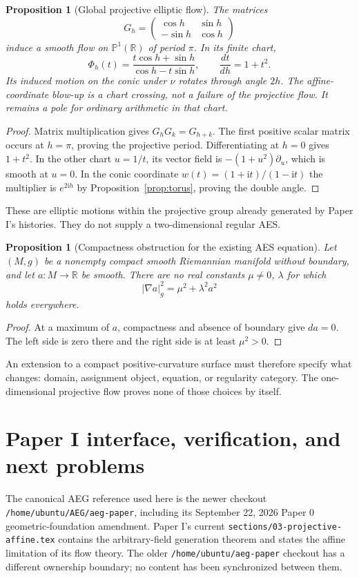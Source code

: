 \documentclass[11pt]{article}
\newtheorem{proposition}[theorem]{Proposition}
\theoremstyle{definition}
\theoremstyle{remark}
\newcommand{\R}{\mathbb R}
\newcommand{\PP}{\mathbb P}
\newcommand{\ii}{\mathrm i}
\begin{document}
\begin{proposition}[Global projective elliptic flow]\label{prop:real-flow}
The matrices
\[
 G_h=\begin{pmatrix}\cos h&\sin h\\-\sin h&\cos h\end{pmatrix}
\]
induce a smooth flow on $\PP^1(\R)$ of period $\pi$. In its finite chart,
\[
 \Phi_h(t)=\frac{t\cos h+\sin h}{\cos h-t\sin h},\qquad
 \frac{dt}{dh}=1+t^2.
\]
Its induced motion on the conic under $\nu$ rotates through angle $2h$.
The affine-coordinate blow-up is a chart crossing, not a failure of the
projective flow. It remains a pole for ordinary arithmetic in that chart.
\end{proposition}
\begin{proof}
Matrix multiplication gives $G_hG_k=G_{h+k}$. The first positive scalar
matrix occurs at $h=\pi$, proving the projective period. Differentiating at
$h=0$ gives $1+t^2$. In the other chart $u=1/t$, its vector field is
$-(1+u^2)\partial_u$, which is smooth at $u=0$. In the conic coordinate
$w(t)=(1+\ii t)/(1-\ii t)$ the multiplier is $e^{2\ii h}$ by
Proposition~\ref{prop:torus}, proving the double angle.
\end{proof}

These are elliptic motions within the projective group already generated by
Paper I's histories. They do not supply a two-dimensional regular AES.
\begin{proposition}[Compactness obstruction for the existing AES equation]
\label{prop:compact}
Let $(M,g)$ be a nonempty compact smooth Riemannian manifold without boundary,
and let $a:M\to\R$ be smooth. There are no real constants $\mu\ne0$, $\lambda$
for which
\[
 |\nabla a|_g^2=\mu^2+\lambda^2a^2
\]
holds everywhere.
\end{proposition}
\begin{proof}
At a maximum of $a$, compactness and absence of boundary give $da=0$.
The left side is zero there and the right side is at least $\mu^2>0$.
\end{proof}
An extension to a compact positive-curvature surface must therefore specify
what changes: domain, assignment object, equation, or regularity category.
The one-dimensional projective flow proves none of those choices by itself.

\section{Paper I interface, verification, and next problems}
The canonical AEG reference used here is the newer checkout
\texttt{/home/ubuntu/AEG/aeg-paper}, including its September 22, 2026
Paper 0 geometric-foundation amendment. Paper I's current
\texttt{sections/03-projective-affine.tex} contains the arbitrary-field
generation theorem and states the affine limitation of its flow theory.
The older \texttt{/home/ubuntu/aeg-paper} checkout has a different ownership
boundary; no content has been synchronized between them.
\end{document}
